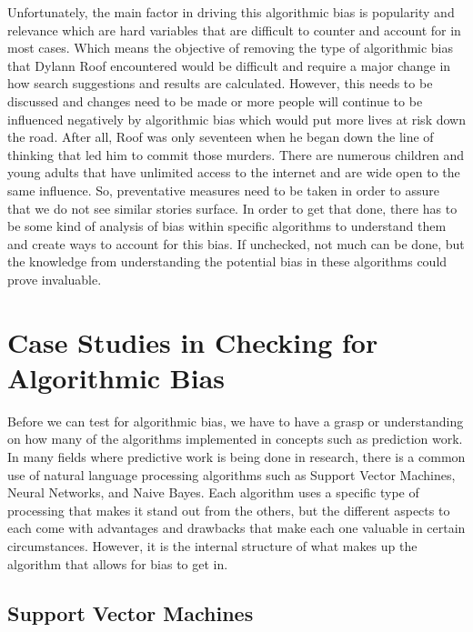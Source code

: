 \documentclass[sigconf]{acmart}
\begin{document}
Unfortunately, the main factor in driving this algorithmic bias is popularity and relevance which are hard variables that are difficult to counter and account for in most cases. Which means the objective of removing the type of algorithmic bias that Dylann Roof encountered would be difficult and require a major change in how search suggestions and results are calculated. However, this needs to be discussed and changes need to be made or more people will continue to be influenced negatively by algorithmic bias which would put more lives at risk down the road. After all, Roof was only seventeen when he began down the line of thinking that led him to commit those murders. There are numerous children and young adults that have unlimited access to the internet and are wide open to the same influence. So, preventative measures need to be taken in order to assure that we do not see similar stories surface. In order to get that done, there has to be some kind of analysis of bias within specific algorithms to understand them and create ways to account for this bias. If unchecked, not much can be done, but the knowledge from understanding the potential bias in these algorithms could prove invaluable.

\section{Case Studies in Checking for Algorithmic Bias}

Before we can test for algorithmic bias, we have to have a grasp or understanding on how many of the algorithms implemented in concepts such as prediction work. In many fields where predictive work is being done in research, there is a common use of natural language processing algorithms such as Support Vector Machines, Neural Networks, and Naive Bayes. Each algorithm uses a specific type of processing that makes it stand out from the others, but the different aspects to each come with advantages and drawbacks that make each one valuable in certain circumstances. However, it is the internal structure of what makes up the algorithm that allows for bias to get in.

\subsection{Support Vector Machines}
\end{document}
